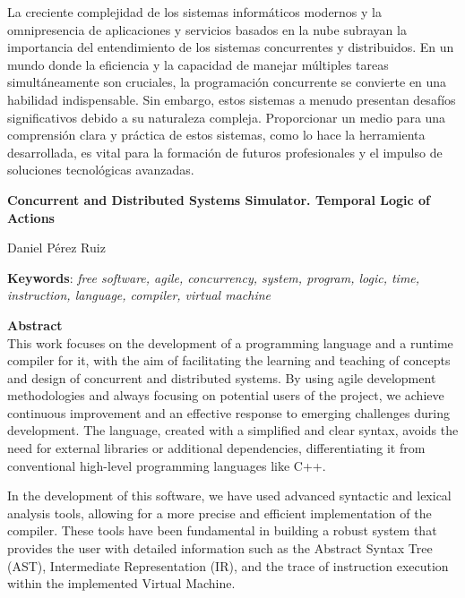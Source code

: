 La creciente complejidad de los sistemas informáticos modernos y la omnipresencia de aplicaciones y servicios basados en la nube subrayan la importancia del entendimiento de los sistemas concurrentes y distribuidos. En un mundo donde la eficiencia y la capacidad de manejar múltiples tareas simultáneamente son cruciales, la programación concurrente se convierte en una habilidad indispensable. Sin embargo, estos sistemas a menudo presentan desafíos significativos debido a su naturaleza compleja. Proporcionar un medio para una comprensión clara y práctica de estos sistemas, como lo hace la herramienta desarrollada, es vital para la formación de futuros profesionales y el impulso de soluciones tecnológicas avanzadas.

\cleardoublepage

\begin{center}
	{\large\bfseries Concurrent and Distributed Systems Simulator. Temporal Logic of Actions}\\
\end{center}
\begin{center}
	Daniel Pérez Ruiz\\
\end{center}
\vspace{0.5cm}
\noindent\textbf{Keywords}: \textit{free software, agile, concurrency, system, program, logic, time, instruction, language, compiler, virtual machine}
\vspace{0.7cm}

\noindent\textbf{Abstract}\\
This work focuses on the development of a programming language and a runtime compiler for it, with the aim of facilitating the learning and teaching of concepts and design of concurrent and distributed systems. By using agile development methodologies and always focusing on potential users of the project, we achieve continuous improvement and an effective response to emerging challenges during development. The language, created with a simplified and clear syntax, avoids the need for external libraries or additional dependencies, differentiating it from conventional high-level programming languages like C++.

In the development of this software, we have used advanced syntactic and lexical analysis tools, allowing for a more precise and efficient implementation of the compiler. These tools have been fundamental in building a robust system that provides the user with detailed information such as the Abstract Syntax Tree (AST), Intermediate Representation (IR), and the trace of instruction execution within the implemented Virtual Machine.


